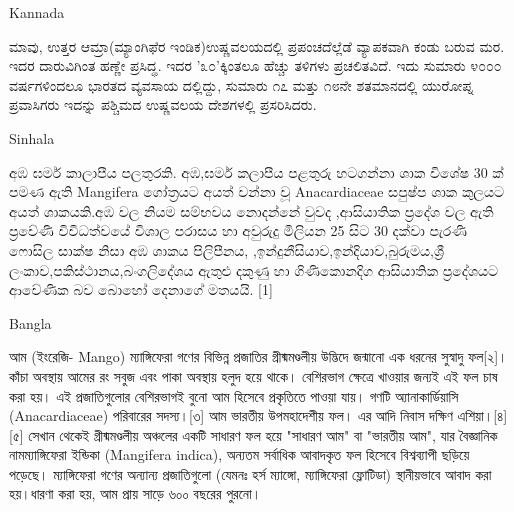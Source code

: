 \documentclass{article}
\newcommand\cheaderbox[1]{\colorbox{blue!12}{#1}}
\begin{document}

\cheaderbox{Kannada}

ಮಾವು, ಉತ್ತರ ಆಮ್ರಾ(ಮ್ಯಾಂಗಿಫೆರ ಇಂಡಿಕ)ಉಷ್ಣವಲಯದಲ್ಲಿ ಪ್ರಪಂಚದೆಲ್ಲೆಡೆ ವ್ಯಾಪಕವಾಗಿ ಕಂಡು ಬರುವ ಮರ. ಇದರ ದಾರುವಿಗಿಂತ ಹಣ್ಣೇ ಪ್ರಸಿದ್ಢ. ಇದರ '೩೦'ಕ್ಕಿಂತಲೂ ಹೆಚ್ಚು ತಳಿಗಳು ಪ್ರಚಲಿತವಿದೆ. ಇದು ಸುಮಾರು ೪೦೦೦ ವರ್ಷಗಳಿಂದಲೂ ಭಾರತದ ವ್ಯವಸಾಯ ದಲ್ಲಿದ್ದು, ಸುಮಾರು ೧೭ ಮತ್ತು ೧೮ನೇ ಶತಮಾನದಲ್ಲಿ ಯುರೋಪ್ನ ಪ್ರವಾಸಿಗರು ಇದನ್ನು ಪಶ್ಚಿಮದ ಉಷ್ಣವಲಯ ದೇಶಗಳಲ್ಲಿ ಪ್ರಸರಿಸಿದರು. 


\cheaderbox{Sinhala}

අඹ ඝර්ම කාලාපීය පලතුරකි. අඹ,ඝර්ම කලාපීය පළතුරු හටගන්නා ශාක විශේෂ 30 ක් පමණ ඇති Mangifera ගෝත්‍රයට අයත් වන්නා වූ Anacardiaceae සපුෂ්ප ශාක කුලයට අයත් ශාකයකි.අඹ වල නියම සම්භවය නොදන්නේ වුවද ,ආසියාතික ප්‍රදේශ වල ඇති ප්‍රවේණි විවිධත්වයේ විශාල පරාසය හා අවුරුදු මිලියන 25 සිට 30 දක්වා පැරණි ෆොසිල සාක්ෂ නිසා අඹ ශාකය පිලිපීනය, ,ඉන්දුනීසියාව,ඉන්දියාව,බුරුමය,ශ්‍රී ලංකාව,පකිස්ථානය,බංගලිදේශය ඇතුළු දකුණු හා ගිණිකොනදිග ආසියාතික ප්‍රදේශයට ආවේණික බව බොහෝ දෙනාගේ මතයයි. [1]



\cheaderbox{Bangla}

আম (ইংরেজি- Mango) ম্যাঙ্গিফেরা গণের বিভিন্ন প্রজাতির গ্রীষ্মমণ্ডলীয় উদ্ভিদে জন্মানো এক ধরনের সুস্বাদু ফল[২]।
 কাঁচা অবস্থায় আমের রং সবুজ এবং পাকা অবস্থায় হলুদ হয়ে থাকে।
 বেশিরভাগ ক্ষেত্রে খাওয়ার জন্যই এই ফল চাষ করা হয়।
  এই প্রজাতিগুলোর বেশিরভাগই বুনো আম হিসেবে প্রকৃতিতে পাওয়া যায়। গণটি অ্যানাকার্ডিয়াসি (Anacardiaceae) পরিবারের সদস্য।[৩]
   আম ভারতীয় উপমহাদেশীয় ফল।
    এর আদি নিবাস দক্ষিণ এশিয়া।[৪][৫]
    সেখান থেকেই গ্রীষ্মমণ্ডলীয় অঞ্চলের একটি সাধারণ ফল হয়ে "সাধারণ আম" বা "ভারতীয় আম", যার বৈজ্ঞানিক নামম্যাঙ্গিফেরা ইন্ডিকা (Mangifera indica), অন্যতম সর্বাধিক আবাদকৃত ফল হিসেবে বিশ্বব্যাপী ছড়িয়ে পড়েছে। ম্যাঙ্গিফেরা গণের অন্যান্য প্রজাতিগুলো (যেমনঃ হর্স ম্যাঙ্গো, ম্যাঙ্গিফেরা ফ্লোটিডা) স্থানীয়ভাবে আবাদ করা হয়।ধারণা করা হয়, আম প্রায় সাড়ে ৬০০ বছরের পুরনো।
\end{document}
